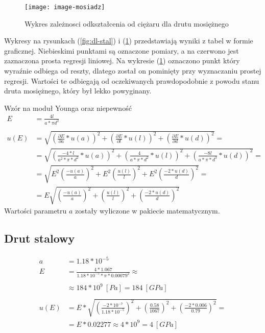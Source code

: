 \documentclass[a4paper,10pt,twoside]{article}
\begin{document}
\begin{figure}[h]
\vspace{20pt}
\centerline{\texttt{[image: image-mosiadz]}}
\caption{Wykres zależnosci odkształcenia od ciężaru dla drutu mosiężnego}
\label{fig:dl-mosiadz}
\end{figure}

Wykresy na rysunkach (\ref{fig:dl-stal}) i (\ref{fig:dl-mosiadz}) przedstawiają wyniki z tabel w formie graficznej.
Niebieskimi punktami są oznaczone pomiary, a na czerwono jest zaznaczona prosta regresji liniowej. Na wykresie (\ref{fig:dl-mosiadz})
oznaczono punkt który wyraźnie odbiega od reszty, dlatego został on pominięty przy wyznaczaniu prostej regresji. Wartości te odbiegają
od oczekiwanych prawdopodobnie z powodu stanu druta mosiężnego, który był lekko powyginany.

\newpage
Wzór na moduł Younga oraz niepewność
\begin{equation*}
\begin{split}
E&=\frac{4l}{a*\pi d^2}\\
\\
u(E)&=\sqrt{\left (\frac{\partial E}{\partial a}*u(a)\right )^2+\left (\frac{\partial E}{\partial l}*u(l)\right )^2+\left (\frac{\partial E}{\partial d}*u(d)\right )^2}=\\
&=\sqrt{\left(\frac{-4*l}{a^2*\pi *d^2}*u(a)\right)^2+\left(\frac{4}{a*\pi *d^2}*u(l)\right)^2+\left(\frac{-8l}{a*\pi *d^3}*u(d)\right)^2}=\\
&= \sqrt{E^2\left (\frac{-u(a)}{a} \right )^2 + E^2\left (\frac{u(l)}{l} \right )^2 + E^2\left (\frac{-2*u(d)}{d} \right )^2}=\\
&= E\sqrt{\left (\frac{-u(a)}{a} \right )^2 + \left (\frac{u(l)}{l} \right )^2 + \left (\frac{-2*u(d)}{d} \right )^2}
\end{split}
\end{equation*}
Wartości parametru $a$ zostały wyliczone w pakiecie matematycznym.

\subsection{Drut stalowy}
\begin{equation*}
\begin{split}
a&=1.18*10^{-5}\\
E&=\frac{4*1.067}{1.18*10^{-5}*\pi*0.00079^2}\approx\\\\
&\approx 184*10^9~[Pa] = 184~[GPa]\\
\\
u(E)&=E*\sqrt{\left(\frac{-2*10^{-7}}{1.18*10^{-5}} \right )^2+\left(\frac{0.58}{1067} \right )^2+\left(\frac{-2*0.006}{0.79} \right )^2}=\\
&= E*0.02277 \approx 4*10^9 = 4~[GPa]
\end{split}
\end{equation*}
\end{document}
